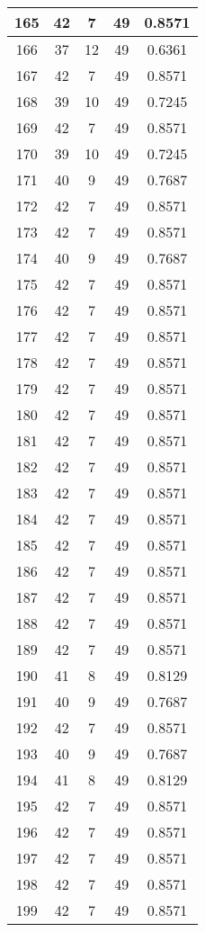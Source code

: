 \documentclass[letterpaper, 12pt]{article}
\begin{document}
\begin{longtable}{|c|c|c|c|c|}
\hline
165 & 42 & 7 & 49 & 0.8571 \\
\hline
166 & 37 & 12 & 49 & 0.6361 \\
\hline
167 & 42 & 7 & 49 & 0.8571 \\
\hline
168 & 39 & 10 & 49 & 0.7245 \\
\hline
169 & 42 & 7 & 49 & 0.8571 \\
\hline
170 & 39 & 10 & 49 & 0.7245 \\
\hline
171 & 40 & 9 & 49 & 0.7687 \\
\hline
172 & 42 & 7 & 49 & 0.8571 \\
\hline
173 & 42 & 7 & 49 & 0.8571 \\
\hline
174 & 40 & 9 & 49 & 0.7687 \\
\hline
175 & 42 & 7 & 49 & 0.8571 \\
\hline
176 & 42 & 7 & 49 & 0.8571 \\
\hline
177 & 42 & 7 & 49 & 0.8571 \\
\hline
178 & 42 & 7 & 49 & 0.8571 \\
\hline
179 & 42 & 7 & 49 & 0.8571 \\
\hline
180 & 42 & 7 & 49 & 0.8571 \\
\hline
181 & 42 & 7 & 49 & 0.8571 \\
\hline
182 & 42 & 7 & 49 & 0.8571 \\
\hline
183 & 42 & 7 & 49 & 0.8571 \\
\hline
184 & 42 & 7 & 49 & 0.8571 \\
\hline
185 & 42 & 7 & 49 & 0.8571 \\
\hline
186 & 42 & 7 & 49 & 0.8571 \\
\hline
187 & 42 & 7 & 49 & 0.8571 \\
\hline
188 & 42 & 7 & 49 & 0.8571 \\
\hline
189 & 42 & 7 & 49 & 0.8571 \\
\hline
190 & 41 & 8 & 49 & 0.8129 \\
\hline
191 & 40 & 9 & 49 & 0.7687 \\
\hline
192 & 42 & 7 & 49 & 0.8571 \\
\hline
193 & 40 & 9 & 49 & 0.7687 \\
\hline
194 & 41 & 8 & 49 & 0.8129 \\
\hline
195 & 42 & 7 & 49 & 0.8571 \\
\hline
196 & 42 & 7 & 49 & 0.8571 \\
\hline
197 & 42 & 7 & 49 & 0.8571 \\
\hline
198 & 42 & 7 & 49 & 0.8571 \\
\hline
199 & 42 & 7 & 49 & 0.8571 \\
\hline
\end{longtable}
\end{document}
